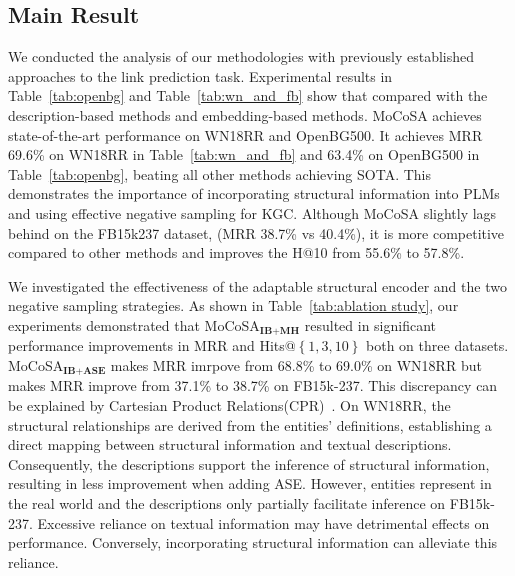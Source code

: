 \documentclass[11pt]{article}
\begin{document}
\subsection{Main Result}
We conducted the analysis of our methodologies with previously established approaches to the link prediction task. Experimental results in Table~\ref{tab:openbg} and Table~\ref{tab:wn_and_fb} show that compared with the description-based methods and embedding-based methods. MoCoSA achieves state-of-the-art performance on WN18RR and OpenBG500. It achieves MRR 69.6\% on WN18RR in Table~\ref{tab:wn_and_fb} and 63.4\% on OpenBG500 in Table~\ref{tab:openbg}, beating all other methods achieving SOTA. This demonstrates the importance of incorporating structural information into PLMs and using effective negative sampling for KGC. Although MoCoSA slightly lags behind on the FB15k237 dataset, (MRR 38.7\% vs 40.4\%), it is more competitive compared to other methods and improves the H@10 from 55.6\% to 57.8\%.  

We investigated the effectiveness of the adaptable structural encoder and the two negative sampling strategies. As shown in Table~\ref{tab:ablation study}, our experiments demonstrated that MoCoSA$_\textbf{IB+MH}$ resulted in significant performance improvements in MRR and Hits@$\left\{1, 3, 10\right\}$ both on three datasets. MoCoSA$_\textbf{IB+ASE}$ makes MRR imrpove from 68.8\% to 69.0\% on WN18RR but makes MRR improve from 37.1\% to 38.7\% on FB15k-237. This discrepancy can be explained by Cartesian Product Relations(CPR)~\cite{Chen2022KnowledgeIF, Lv2022DoPM, Akrami2020RealisticRO}. On WN18RR, the structural relationships are derived from the entities' definitions, establishing a direct mapping between structural information and textual descriptions. Consequently, the descriptions support the inference of structural information, resulting in less improvement when adding ASE. However, entities represent in the real world and the descriptions only partially facilitate inference on FB15k-237. Excessive reliance on textual information may have detrimental effects on performance. Conversely, incorporating structural information can alleviate this reliance.
\end{document}
